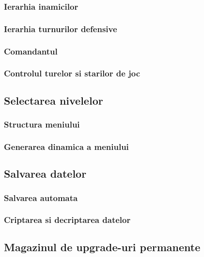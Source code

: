 \documentclass[12pt, a4paper]{article}
\begin{document}
	\subsubsection{Ierarhia inamicilor}
	
	\subsubsection{Ierarhia turnurilor defensive}
	
	\subsubsection{Comandantul}
	
	\subsubsection{Controlul turelor si starilor de joc}
	
	\subsection{Selectarea nivelelor}
	
	\subsubsection{Structura meniului}
	
	\subsubsection{Generarea dinamica a meniului}
	
	
	\subsection{Salvarea datelor}
	
	\subsubsection{Salvarea automata}
	
	\subsubsection{Criptarea si decriptarea datelor}
	
	
	\subsection{Magazinul de upgrade-uri permanente}
	
\end{document}
